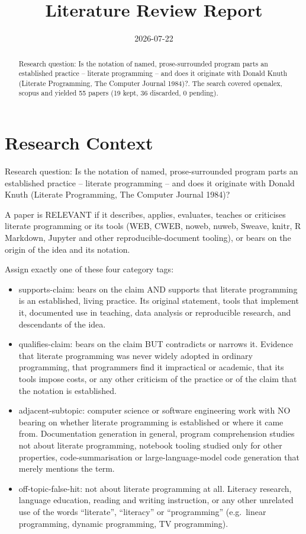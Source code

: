 \documentclass{article}
\title{Literature Review Report}
\date{2026-07-22}
\begin{document}
\maketitle

\begin{abstract}
Research question: Is the notation of named, prose-surrounded program parts an established practice -- literate programming -- and does it originate with Donald Knuth (Literate Programming, The Computer Journal 1984)?. The search covered openalex, scopus and yielded 55 papers (19 kept, 36 discarded, 0 pending).
\end{abstract}
\clearpage
\clearpage
\tableofcontents
\clearpage

\section{Research Context}
Research question: Is the notation of named, prose-surrounded program
parts an established practice -- literate programming -- and does it
originate with Donald Knuth (Literate Programming, The Computer Journal
1984)?

A paper is RELEVANT if it describes, applies, evaluates, teaches or
criticises literate programming or its tools (WEB, CWEB, noweb, nuweb,
Sweave, knitr, R Markdown, Jupyter and other reproducible-document
tooling), or bears on the origin of the idea and its notation.

Assign exactly one of these four category tags:

\begin{itemize}
\item
  supports-claim: bears on the claim AND supports that literate
  programming is an established, living practice. Its original
  statement, tools that implement it, documented use in teaching, data
  analysis or reproducible research, and descendants of the idea.
\item
  qualifies-claim: bears on the claim BUT contradicts or narrows it.
  Evidence that literate programming was never widely adopted in
  ordinary programming, that programmers find it impractical or
  academic, that its tools impose costs, or any other criticism of the
  practice or of the claim that the notation is established.
\item
  adjacent-subtopic: computer science or software engineering work with
  NO bearing on whether literate programming is established or where it
  came from. Documentation generation in general, program comprehension
  studies not about literate programming, notebook tooling studied only
  for other properties, code-summarisation or large-language-model code
  generation that merely mentions the term.
\item
  off-topic-false-hit: not about literate programming at all. Literacy
  research, language education, reading and writing instruction, or any
  other unrelated use of the words ``literate'', ``literacy'' or
  ``programming'' (e.g.~linear programming, dynamic programming, TV
  programming).
\end{itemize}
\end{document}
